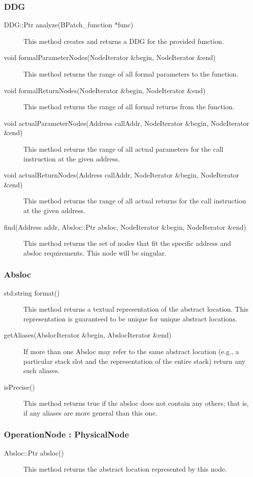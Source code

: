 \documentclass[12pt,titlepage]{article}
\begin{document}
\subsubsection{DDG}
\begin{description}
\item[DDG::Ptr analyze(BPatch\_function *func)]
This method creates and returns a DDG for the provided function.
\item[void formalParameterNodes(NodeIterator \&begin, NodeIterator \&end) ]
This method returns the range of all formal parameters to the function.
\item[void formalReturnNodes(NodeIterator \&begin, NodeIterator \&end)]
This method returns the range of all formal returns from the function.
\item[void actualParameterNodes(Address callAddr, NodeIterator \&begin, NodeIterator \&end) ]
This method returns the range of all actual parameters for the call instruction
at the given address.
\item[void actualReturnNodes(Address callAddr, NodeIterator \&begin, NodeIterator \&end)]
This method returns the range of all actual returns for the call instruction at
the given address.
\item[find(Address addr, Absloc::Ptr absloc, NodeIterator \&begin, NodeIterator \&end) ]
This method returns the set of nodes that fit the specific address and absloc requirements. This node will be singular. 
\end{description}

\subsubsection{Absloc}
\begin{description}
\item[std:string format()]
This method returns a textual representation of the abstract location. This representation is guaranteed to be unique for unique abstract locations.
\item[getAliases(AbslocIterator \&begin, AbslocIterator \&end)]
If more than one Absloc may refer to the same abstract location (e.g., a particular stack slot and the representation of the entire stack) return any such aliases.
\item[isPrecise()]
This method returns true if the absloc does not contain any others; that is, if any aliases are more general than this one.
\end{description}

\subsubsection{OperationNode : PhysicalNode}
\begin{description}
\item[Absloc::Ptr absloc()]
This method returns the abstract location represented by this node.
\end{description}
\end{document}
